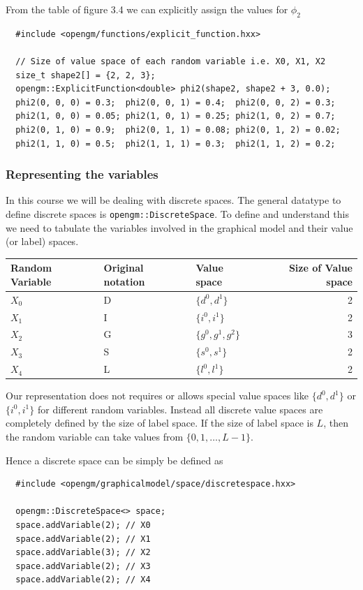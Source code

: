 \documentclass[12pt,oneside,letterpaper]{article}
\begin{document}
From the table of figure 3.4 we can explicitly assign the values for $\phi_2$

\begin{lstlisting}
  #include <opengm/functions/explicit_function.hxx>

  // Size of value space of each random variable i.e. X0, X1, X2
  size_t shape2[] = {2, 2, 3};
  opengm::ExplicitFunction<double> phi2(shape2, shape2 + 3, 0.0);
  phi2(0, 0, 0) = 0.3;  phi2(0, 0, 1) = 0.4;  phi2(0, 0, 2) = 0.3;
  phi2(1, 0, 0) = 0.05; phi2(1, 0, 1) = 0.25; phi2(1, 0, 2) = 0.7;
  phi2(0, 1, 0) = 0.9;  phi2(0, 1, 1) = 0.08; phi2(0, 1, 2) = 0.02;
  phi2(1, 1, 0) = 0.5;  phi2(1, 1, 1) = 0.3;  phi2(1, 1, 2) = 0.2;
\end{lstlisting}


\subsubsection{Representing the variables}

In this course we will be dealing with discrete spaces. The general datatype to
define discrete spaces is \lstinline|opengm::DiscreteSpace|. To define and
understand this we need to tabulate the variables involved in the graphical
model and their value (or label) spaces.

\begin{tabular}{|l|l|l|r|}
  \hline
  Random Variable & Original notation & Value space & Size of Value space \\
  \hline
  $X_0$ & D & $\{d^0, d^1\}$ & 2\\
  $X_1$ & I & $\{i^0, i^1\}$ & 2\\
  $X_2$ & G & $\{g^0, g^1, g^2\}$ & 3\\
  $X_3$ & S & $\{s^0, s^1\}$ & 2\\
  $X_4$ & L & $\{l^0, l^1\}$ & 2\\
  \hline
\end{tabular}

Our representation does not requires or allows special value spaces like
$\{d^0, d^1\}$ or $\{i^0, i^1\}$ for different random variables. 
Instead all discrete value spaces are completely defined by the size of label
space. If the size of label space is $L$, then the random variable can take
values from $\{0, 1, \dots, L - 1\}$.

Hence a discrete space can be simply be defined as 

\begin{lstlisting}
  #include <opengm/graphicalmodel/space/discretespace.hxx>

  opengm::DiscreteSpace<> space;
  space.addVariable(2); // X0
  space.addVariable(2); // X1
  space.addVariable(3); // X2
  space.addVariable(2); // X3
  space.addVariable(2); // X4
\end{lstlisting}
\end{document}
